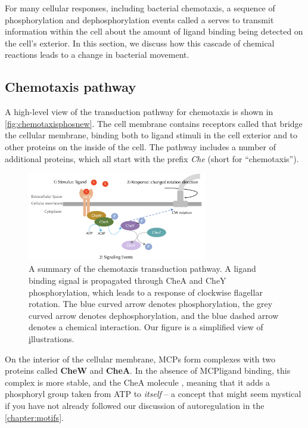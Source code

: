 For many cellular responses, including bacterial chemotaxis, a sequence of phosphorylation and dephosphorylation events called a  serves to transmit information within the cell about the amount of ligand binding being detected on the cell's exterior. In this section, we discuss how this cascade of chemical reactions leads to a change in bacterial movement.

\FloatBarrier
{}
{}
\subsection{Chemotaxis pathway}

A high-level view of the transduction pathway for chemotaxis is shown in \autoref{fig:chemotaxisphosnew}. The cell membrane contains receptors called  that bridge the cellular membrane, binding both to ligand stimuli in the cell exterior and to other proteins on the inside of the cell. The pathway includes a number of additional proteins, which all start with the prefix \textit{Che} (short for ``chemotaxis'').

\begin{figure}[h]
\centering
\mySfFamily
\includegraphics[width = 0.7\textwidth]{../images/chemotaxisphosnew.png}
\caption{A summary of the chemotaxis transduction pathway. A ligand binding signal is propagated through CheA and CheY phosphorylation, which leads to a response of clockwise flagellar rotation. The blue curved arrow denotes phosphorylation, the grey curved arrow denotes dephosphorylation, and the blue dashed arrow denotes a chemical interaction. Our figure is a simplified view of \href{http://chemotaxis.biology.utah.edu/Parkinson_Lab/projects/ecolichemotaxis/ecolichemotaxis.html} illustrations.}
\label{fig:chemotaxisphosnew}
\end{figure}


On the interior of the cellular membrane, MCPs form complexes with two proteins called \textbf{CheW} and \textbf{CheA}. In the absence of MCP\-ligand binding, this complex is more stable, and the CheA molecule , meaning that it adds a phosphoryl group taken from ATP to \textit{itself} -- a concept that might seem mystical if you have not already followed our discussion of autoregulation in the \autoref{chapter:motifs}.

